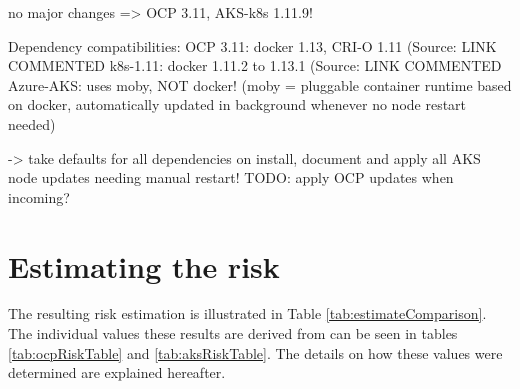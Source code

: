 no major changes => OCP 3.11, AKS-k8s 1.11.9!

Dependency compatibilities:
OCP 3.11: docker 1.13, CRI-O 1.11 (Source: LINK COMMENTED %
k8s-1.11: docker 1.11.2 to 1.13.1  (Source: LINK COMMENTED %
Azure-AKS: uses moby, NOT docker! (moby = pluggable container runtime based on docker, automatically updated in background whenever no node restart needed)

-> take defaults for all dependencies on install, document and apply all AKS node updates needing manual restart!
TODO: apply OCP updates when incoming?


\section{Estimating the risk} \label{riskEstimate}

The resulting risk estimation is illustrated in Table \ref{tab:estimateComparison}. The individual values these results are derived from can be seen in tables \ref{tab:ocpRiskTable} and \ref{tab:aksRiskTable}. The details on how these values were determined are explained hereafter.

